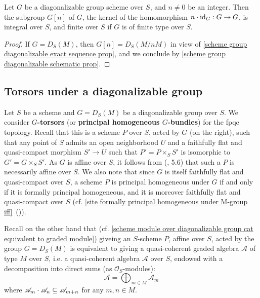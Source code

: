 \begin{corollary}\label{scheme group diagonalizable n-torsion subgroup prop}
Let $G$ be a diagonalizable group scheme over $S$, and $n\neq 0$ be an integer. Then the subgroup $G[n]$ of $G$, the kernel of the homomorphism $n\cdot\operatorname{id}_G:G\to G$, is integral over $S$, and finite over $S$ if $G$ is of finite type over $S$.
\end{corollary}
\begin{proof}
If $G=D_S(M)$, then $G[n]=D_S(M/nM)$ in view of \cref{scheme group diagonalizable exact sequence prop}, and we conclude by \cref{scheme group diagonalizable schematic prop}.
\end{proof}

\subsection{Torsors under a diagonalizable group}
Let $S$ be a scheme and $G=D_S(M)$ be a diagonalizable group over $S$. We consider \textbf{$G$-torsors} (or \textbf{principal homogeneous $G$-bundles}) for the fpqc topology. Recall that this is a scheme $P$ over $S$, acted by $G$ (on the right), such that any point of $S$ admits an open neighborhood $U$ and a faithfully flat and quasi-compact morphism $S'\to U$ such that $P'=P\times_SS'$ is isomorphic to $G'=G\times_SS'$. As $G$ is affine over $S$, it follows from (\cite{SGA1},  5.6) that such a $P$ is necessarily affine over $S$. We also note that since $G$ is itself faithfully flat and quasi-compact over $S$, a scheme $P$ is principal homogeneous under $G$ if and only if it is formally principal homogeneous, and it is moreover faithfully flat and quasi-compact over $S$ (cf. \cref{site formally principal homogeneous under M-group iff}~()).\par
Recall on the other hand that (cf. \cref{scheme module over diagonalizable group cat equivalent to graded module}) giveing an $S$-scheme $P$, affine over $S$, acted by the group $G=D_S(M)$ is equivalent to giving a quasi-coherent graded algebra $\mathscr{A}$ of type $M$ over $S$, i.e. a quasi-coherent algebra $\mathscr{A}$ over $S$, endowed with a decomposition into direct sums (as $\mathscr{O}_S$-modules):
\[\mathscr{A}=\bigoplus_{m\in M}\mathscr{A}_m\]
where $\mathscr{A}_m\cdot\mathscr{A}_n\subseteq\mathscr{A}_{m+n}$ for any $m,n\in M$.

